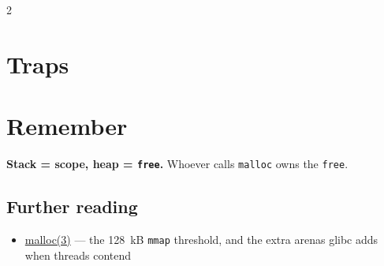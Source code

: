 \documentclass[8pt]{extarticle}
\begin{document}
\begin{multicols}{2}
\section{Traps}
\begin{itemize}
\end{itemize}

\section{Remember}
\textbf{Stack = scope, heap = \texttt{free}.} Whoever calls \texttt{malloc} owns the \texttt{free}.

\begin{htmlonly}
\section{Further reading}
\begin{itemize}
  \item \href{https://man7.org/linux/man-pages/man3/malloc.3.html}{malloc(3)} — the 128~kB
        \texttt{mmap} threshold, and the extra arenas glibc adds when threads contend
\end{itemize}
\end{htmlonly}

\end{multicols}

\end{document}
